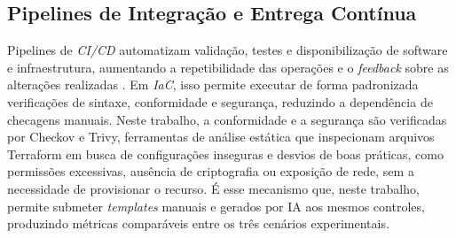 \subsection{Pipelines de Integração e Entrega Contínua}

Pipelines de \textit{CI/CD} automatizam validação, testes e disponibilização de software e infraestrutura, aumentando a repetibilidade das operações e o \textit{feedback} sobre as alterações realizadas \cite{humble2010continuous}. Em \textit{IaC}, isso permite executar de forma padronizada verificações de sintaxe, conformidade e segurança, reduzindo a dependência de checagens manuais. Neste trabalho, a conformidade e a segurança são verificadas por Checkov e Trivy, ferramentas de análise estática que inspecionam arquivos Terraform em busca de configurações inseguras e desvios de boas práticas, como permissões excessivas, ausência de criptografia ou exposição de rede, sem a necessidade de provisionar o recurso. É esse mecanismo que, neste trabalho, permite submeter \textit{templates} manuais e gerados por IA aos mesmos controles, produzindo métricas comparáveis entre os três cenários experimentais.
